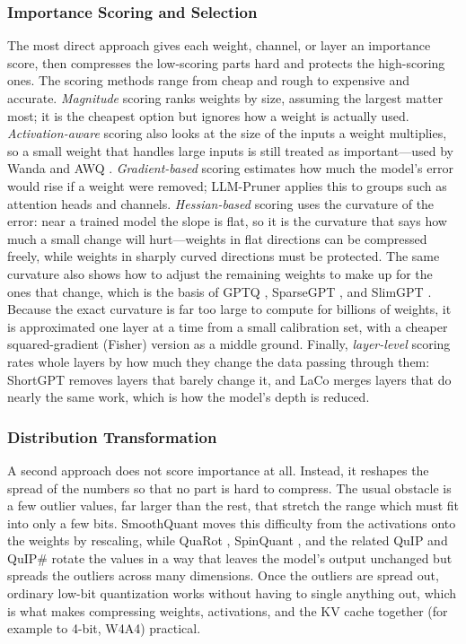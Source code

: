 \documentclass[
11pt, %
english, %
singlespacing, %
headsepline, %
]{MastersDoctoralThesis} %
\begin{document}
\subsubsection{Importance Scoring and Selection}

The most direct approach gives each weight, channel, or layer an importance score, then compresses the low-scoring parts hard and protects the high-scoring ones. The scoring methods range from cheap and rough to expensive and accurate. \emph{Magnitude} scoring ranks weights by size, assuming the largest matter most; it is the cheapest option but ignores how a weight is actually used. \emph{Activation-aware} scoring also looks at the size of the inputs a weight multiplies, so a small weight that handles large inputs is still treated as important---used by Wanda \cite{sun2024wanda} and AWQ \cite{lin2024awq}. \emph{Gradient-based} scoring estimates how much the model's error would rise if a weight were removed; LLM-Pruner \cite{ma2023llmpruner} applies this to groups such as attention heads and channels. \emph{Hessian-based} scoring uses the curvature of the error: near a trained model the slope is flat, so it is the curvature that says how much a small change will hurt---weights in flat directions can be compressed freely, while weights in sharply curved directions must be protected. The same curvature also shows how to adjust the remaining weights to make up for the ones that change, which is the basis of GPTQ \cite{frantar2023gptq}, SparseGPT \cite{frantar2023sparsegpt}, and SlimGPT \cite{ling2024slimgpt}. Because the exact curvature is far too large to compute for billions of weights, it is approximated one layer at a time from a small calibration set, with a cheaper squared-gradient (Fisher) version as a middle ground. Finally, \emph{layer-level} scoring rates whole layers by how much they change the data passing through them: ShortGPT \cite{men2024shortgpt} removes layers that barely change it, and LaCo \cite{yang2024laco} merges layers that do nearly the same work, which is how the model's depth is reduced.

\subsubsection{Distribution Transformation}

A second approach does not score importance at all. Instead, it reshapes the spread of the numbers so that no part is hard to compress. The usual obstacle is a few outlier values, far larger than the rest, that stretch the range which must fit into only a few bits. SmoothQuant \cite{xiao2023smoothquant} moves this difficulty from the activations onto the weights by rescaling, while QuaRot \cite{ashkboos2024quarot}, SpinQuant \cite{liu2025spinquant}, and the related QuIP and QuIP\# \cite{chee2023quip,tseng2024quipsharp} rotate the values in a way that leaves the model's output unchanged but spreads the outliers across many dimensions. Once the outliers are spread out, ordinary low-bit quantization works without having to single anything out, which is what makes compressing weights, activations, and the KV cache together (for example to 4-bit, W4A4) practical.
\end{document}
